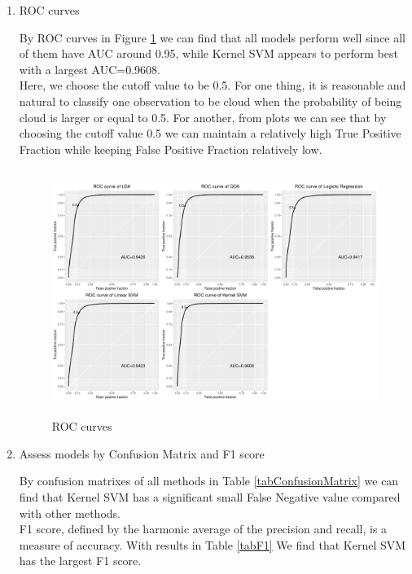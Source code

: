 \documentclass[11pt]{article}
\begin{document}
\begin{enumerate}[label=(\alph*)]
\begin{enumerate}
	
\end{enumerate}



\item ROC curves \par
	By ROC curves in Figure \ref{ROC} we can find that all models perform well since all of them have AUC around 0.95, while Kernel SVM appears to perform best with a largest AUC=0.9608. \\
	Here, we choose the cutoff value to be 0.5. For one thing, it is reasonable and natural to classify one observation to be cloud when the probability of being cloud is larger or equal to 0.5. For another, from plots we can see that by choosing the cutoff value 0.5 we can maintain a relatively high True Positive Fraction while keeping False Positive Fraction relatively low.
	
\begin{figure}[h!]
	\centering
	\includegraphics[height = 8cm]{Figure/ROC.pdf}
	\caption{ROC curves}
	\label{ROC}
\end{figure}

\item Assess models by Confusion Matrix and F1 score \par

	By confusion matrixes of all methods in Table \ref{tabConfusionMatrix} we can find that Kernel SVM has a significant small False Negative value compared with other methods. \\
	F1 score, defined by the harmonic average of the precision and recall, is a measure of accuracy. With results in Table \ref{tabF1} We find that Kernel SVM has the largest F1 score.


\end{enumerate}
\end{document}
